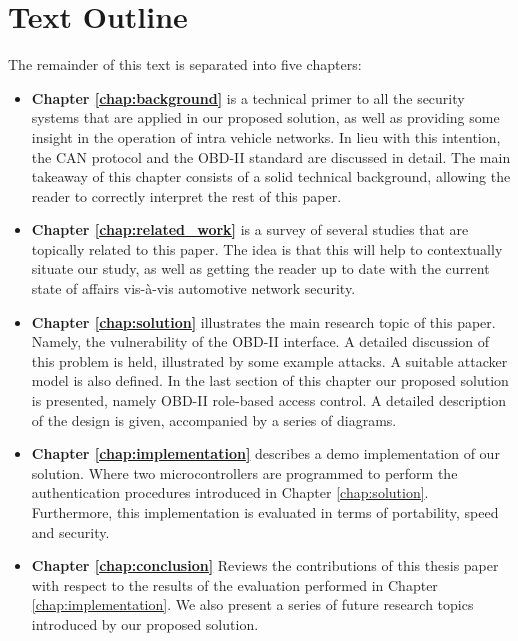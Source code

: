 \section{Text Outline}
The remainder of this text is separated into five chapters:
\begin{itemize}
	\item \textbf{Chapter \ref{chap:background}} is a technical primer to all the security systems that are applied in our proposed solution, as well as providing some insight in the operation of intra vehicle networks. In lieu with this intention, the CAN protocol and the OBD-II standard are discussed in detail. The main takeaway of this chapter consists of a solid technical background, allowing the reader to correctly interpret the rest of this paper.
	
	\item \textbf{Chapter \ref{chap:related_work}} is a survey of several studies that are topically related to this paper. The idea is that this will help to contextually situate our study, as well as getting the reader up to date with the current state of affairs vis-\`a-vis automotive network security.
	
	\item \textbf{Chapter \ref{chap:solution}} illustrates the main research topic of this paper. Namely, the vulnerability of the OBD-II interface. A detailed discussion of this problem is held, illustrated by some example attacks. A suitable attacker model is also defined. In the last section of this chapter our proposed solution is presented, namely OBD-II role-based access control. A detailed description of the design is given, accompanied by a series of diagrams.
	
	\item \textbf{Chapter \ref{chap:implementation}} describes a demo implementation of our solution. Where two microcontrollers are programmed to perform the authentication procedures introduced in Chapter \ref{chap:solution}. Furthermore, this implementation is evaluated in terms of portability, speed and security.
	
	\item \textbf{Chapter \ref{chap:conclusion}} Reviews the contributions of this thesis paper with respect to the results of the evaluation performed in Chapter \ref{chap:implementation}. We also present a series of future research topics introduced by our proposed solution.
\end{itemize}